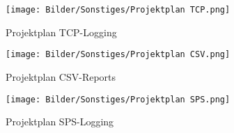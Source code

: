\begin{figure}
\centering
 \texttt{[image: Bilder/Sonstiges/Projektplan TCP.png]}
 \caption[Projektplan TCP-Logging]{Projektplan TCP-Logging}
 \label{fig:projektTCP}
\end{figure}

\begin{figure}
\centering
 \texttt{[image: Bilder/Sonstiges/Projektplan CSV.png]}
 \caption[Projektplan CSV-Reports]{Projektplan CSV-Reports}
 \label{fig:projektCSV}
\end{figure}

\begin{figure}
\centering
 \texttt{[image: Bilder/Sonstiges/Projektplan SPS.png]}
 \caption[Projektplan SPS-Logging]{Projektplan SPS-Logging}
 \label{fig:projektSPS}
\end{figure}
